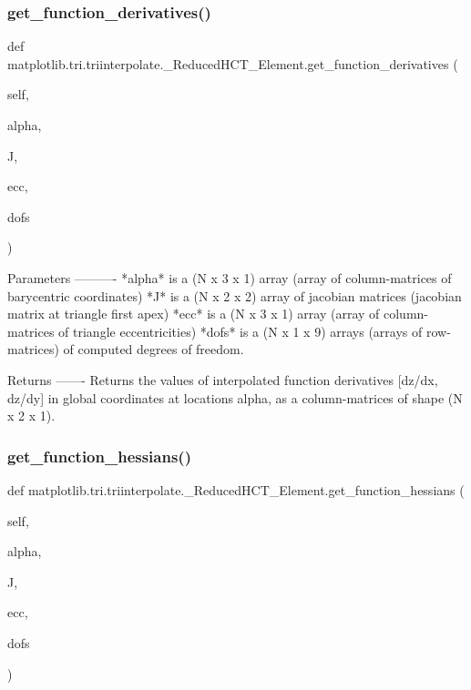 \subsubsection{\texorpdfstring{get\+\_\+function\+\_\+derivatives()}{get\_function\_derivatives()}}
{\footnotesize\ttfamily def matplotlib.\+tri.\+triinterpolate.\+\_\+\+Reduced\+H\+C\+T\+\_\+\+Element.\+get\+\_\+function\+\_\+derivatives (\begin{DoxyParamCaption}\item[{}]{self,  }\item[{}]{alpha,  }\item[{}]{J,  }\item[{}]{ecc,  }\item[{}]{dofs }\end{DoxyParamCaption})}

\begin{DoxyVerb}Parameters
----------
*alpha* is a (N x 3 x 1) array (array of column-matrices of
barycentric coordinates)
*J* is a (N x 2 x 2) array of jacobian matrices (jacobian matrix at
triangle first apex)
*ecc* is a (N x 3 x 1) array (array of column-matrices of triangle
eccentricities)
*dofs* is a (N x 1 x 9) arrays (arrays of row-matrices) of computed
degrees of freedom.

Returns
-------
Returns the values of interpolated function derivatives [dz/dx, dz/dy]
in global coordinates at locations alpha, as a column-matrices of
shape (N x 2 x 1).
\end{DoxyVerb}
 \mbox{\label{classmatplotlib_1_1tri_1_1triinterpolate_1_1__ReducedHCT__Element_a63ff9ad49e37549dcf349c97862d3a4b}} 
\subsubsection{\texorpdfstring{get\+\_\+function\+\_\+hessians()}{get\_function\_hessians()}}
{\footnotesize\ttfamily def matplotlib.\+tri.\+triinterpolate.\+\_\+\+Reduced\+H\+C\+T\+\_\+\+Element.\+get\+\_\+function\+\_\+hessians (\begin{DoxyParamCaption}\item[{}]{self,  }\item[{}]{alpha,  }\item[{}]{J,  }\item[{}]{ecc,  }\item[{}]{dofs }\end{DoxyParamCaption})}

